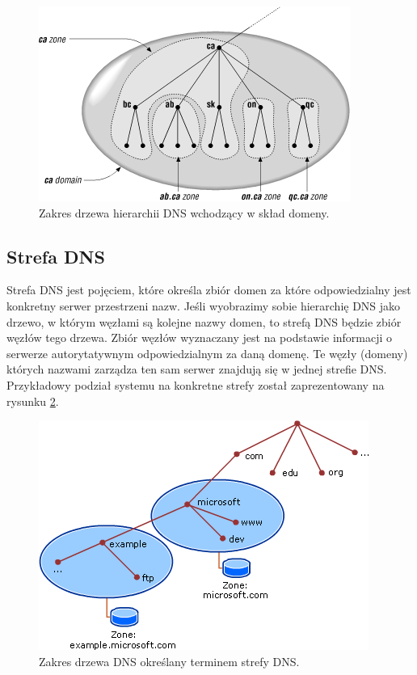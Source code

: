 \begin{center}
	\begin{figure}
	\includegraphics[scale=0.8]{image/domain_example}
	\caption{Zakres drzewa hierarchii DNS wchodzący w skład domeny. \cite{domain_example}}
	\label{fig:domain_dns_example}
	\end{figure}
\end{center}

\subsection{Strefa DNS}
Strefa DNS jest pojęciem, które określa zbiór domen za które odpowiedzialny jest konkretny serwer przestrzeni nazw. Jeśli wyobrazimy
sobie hierarchię DNS jako drzewo, w którym węzłami są kolejne nazwy domen, to strefą DNS będzie zbiór węzłów tego drzewa. Zbiór
węzłów wyznaczany jest na podstawie informacji o serwerze autorytatywnym odpowiedzialnym za daną domenę. Te węzły (domeny)
których nazwami zarządza ten sam serwer znajdują się w jednej strefie DNS. Przykładowy podział systemu na konkretne strefy został
zaprezentowany na rysunku \ref{fig:dns_zone_example}.

\begin{center}
	\begin{figure}
	\includegraphics[scale=0.8]{image/zone_example}
	\caption{Zakres drzewa DNS określany terminem strefy DNS. \cite{zone_example}}
	\label{fig:dns_zone_example}
	\end{figure}
\end{center}

